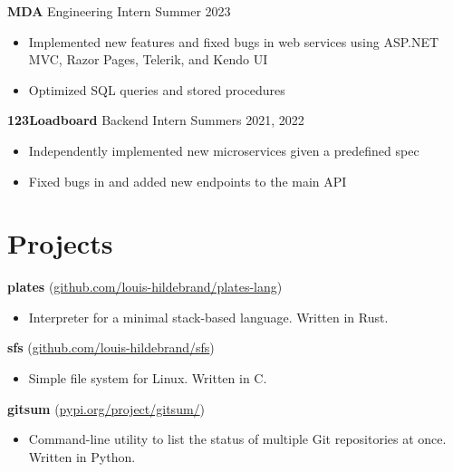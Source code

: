 \documentclass[12pt]{article}
\begin{document}
\textbf{MDA} Engineering Intern
\hfill
Summer 2023
\begin{itemize}
	\item Implemented new features and fixed bugs in web services using ASP.NET MVC, Razor Pages, Telerik, and Kendo UI
	\item Optimized SQL queries and stored procedures
\end{itemize}

\textbf{123Loadboard} Backend Intern
\hfill
Summers 2021, 2022
\begin{itemize}
	\item Independently implemented new microservices given a predefined spec
	\item Fixed bugs in and added new endpoints to the main API
\end{itemize}

\section*{Projects}

\textbf{plates} (\href{https://github.com/louis-hildebrand/plates-lang}{github.com/louis-hildebrand/plates-lang})
\begin{itemize}
	\item Interpreter for a minimal stack-based language. Written in Rust.
\end{itemize}

\textbf{sfs} (\href{https://github.com/louis-hildebrand/sfs}{github.com/louis-hildebrand/sfs})
\begin{itemize}
	\item Simple file system for Linux. Written in C.
\end{itemize}

\textbf{gitsum} (\href{https://pypi.org/project/gitsum/}{pypi.org/project/gitsum/})
\begin{itemize}
	\item Command-line utility to list the status of multiple Git repositories at once. Written in Python.
\end{itemize}
\end{document}
